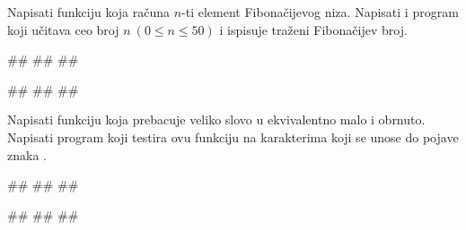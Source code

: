 \begin{Exercise}[label=p1.4_18]
Napisati funkciju  koja računa
$n$-ti element Fibonačijevog niza. Napisati i program koji učitava ceo
broj $n\ (0\leq n\leq 50)$ i ispisuje traženi Fibonačijev broj.

\begin{miditest}
\begin{upotreba}{1}
#\naslovInt#
##
##
\end{upotreba}
\end{miditest}
\begin{miditest}
\begin{upotreba}{2}
#\naslovInt#
##
##
\end{upotreba}
\end{miditest}

\end{Exercise}
\ifresenja 
\begin{Answer}[ref=p1.4_18]
\end{Answer} 
\fi

\begin{Exercise}[label=v1.4_14] 
Napisati funkciju  koja prebacuje veliko
slovo u ekvivalentno malo i obrnuto. Napisati program koji testira ovu
funkciju na karakterima koji se unose do pojave znaka .

\begin{miditest}
\begin{upotreba}{1}
#\naslovInt#
##
##
\end{upotreba}
\end{miditest}
\begin{miditest}
\begin{upotreba}{2}
#\naslovInt#
##
##
\end{upotreba}
\end{miditest}

\end{Exercise}
\ifresenja 
\begin{Answer}[ref=v1.4_14]
\end{Answer} 
\fi


